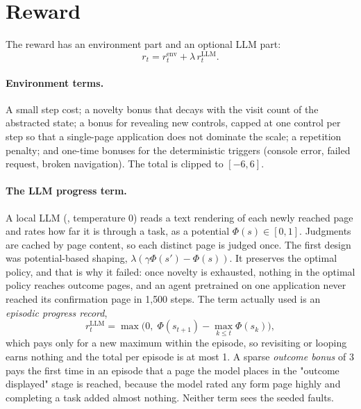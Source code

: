 \section{Reward}
\label{sec:v1-reward}

The reward has an environment part and an optional LLM part:
\begin{equation}
  r_t = r^{\mathrm{env}}_t + \lambda\, r^{\mathrm{LLM}}_t.
\end{equation}

\paragraph{Environment terms.} A small step cost; a novelty bonus that decays with the
visit count of the abstracted state; a bonus for revealing new controls, capped at one
control per step so that a single-page application does not dominate the scale; a
repetition penalty; and one-time bonuses for the deterministic triggers (console error,
failed request, broken navigation). The total is clipped to $[-6, 6]$.

\paragraph{The LLM progress term.} A local LLM (, temperature 0)
reads a text rendering of each newly reached page and rates how far it is through a task, as
a potential $\Phi(s) \in [0,1]$. Judgments are cached by page content, so each distinct page
is judged once. The first design was potential-based shaping,
$\lambda(\gamma\Phi(s') - \Phi(s))$. It preserves the optimal policy, and that is why it
failed: once novelty is exhausted, nothing in the optimal policy reaches outcome pages, and
an agent pretrained on one application never reached its confirmation page in 1{,}500
steps. The term actually used is an \emph{episodic progress record},
\begin{equation}
  r^{\mathrm{LLM}}_t = \max\!\Big(0,\; \Phi(s_{t+1}) - \max_{k \le t} \Phi(s_k)\Big),
\end{equation}
which pays only for a new maximum within the episode, so revisiting or looping earns
nothing and the total per episode is at most 1. A sparse \emph{outcome bonus} of 3 pays the
first time in an episode that a page the model places in the "outcome displayed" stage is
reached, because the model rated any form page highly and completing a task added almost
nothing. Neither term sees the seeded faults.

